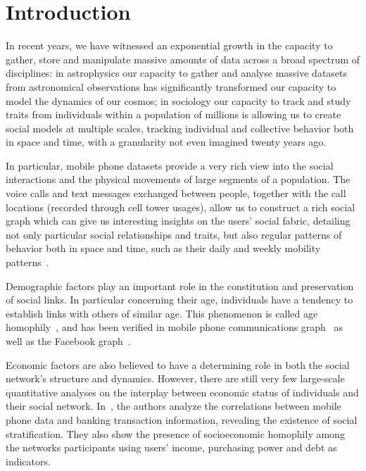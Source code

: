 \section{Introduction}

In recent years, we have witnessed an exponential growth in the capacity to gather, store and manipulate massive amounts of data across a broad spectrum of disciplines: in astrophysics our capacity to gather and analyse massive datasets from astronomical observations has significantly transformed our capacity to model the dynamics of our cosmos; in sociology our capacity to track and study traits from individuals within a population of millions is allowing us to create social models at multiple scales, tracking individual and collective behavior both in space and time, with a granularity not even imagined twenty years ago.

In particular, mobile phone datasets provide a very rich view into the social interactions and the physical movements of large segments of a population. The voice calls and text messages exchanged between people, together with the call locations (recorded through cell tower usages), allow us to construct a rich social graph which can give us interesting insights on the users' social fabric, detailing not only particular social relationships and traits, but also regular patterns of behavior both in space and time, such as their daily and weekly mobility patterns~\cite{gonzalez2008understanding,ponieman2013human,sarraute2015city}.

Demographic factors play an important role in the constitution and preservation of social links. In particular concerning their age, individuals have a tendency to
establish links with others of similar age. This phenomenon is called age homophily~\cite{mcpherson2001birds}, and has been verified in mobile phone communications graph~\cite{blumenstock2010mobile,sarraute2014} as well as the Facebook graph~\cite{ugander2011anatomy}.

Economic factors are also believed to have a determining role in both the social network's structure and dynamics. However, there are still very few large-scale quantitative analyses on the interplay between economic status of individuals and their social network. In~\cite{leo2015socioeconomic}, the authors analyze the correlations between mobile phone data and banking transaction information, revealing the existence of social stratification. They also show the presence of socioeconomic homophily among the networks participants using users' income, purchasing power and debt as indicators.

